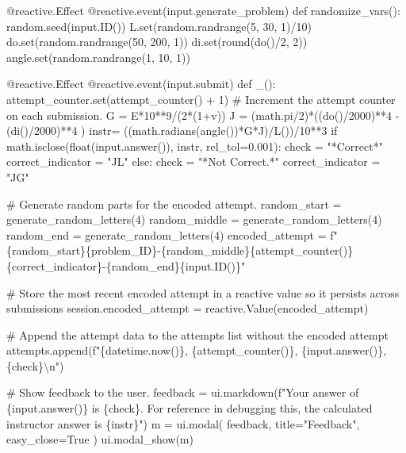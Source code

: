 \documentclass[
  letterpaper,
  DIV=11,
  numbers=noendperiod]{scrreprt}
\newenvironment{Shaded}{\begin{snugshade}}{\end{snugshade}}
\newcommand{\NormalTok}[1]{\textcolor[rgb]{0.00,0.23,0.31}{#1}}
\begin{document}
\begin{Shaded}
\begin{Highlighting}[]
\NormalTok{    @reactive.Effect}
\NormalTok{    @reactive.event(input.generate\_problem)}
\NormalTok{    def randomize\_vars():}
\NormalTok{        random.seed(input.ID())}
\NormalTok{        L.set(random.randrange(5, 30, 1)/10)}
\NormalTok{        do.set(random.randrange(50, 200, 1))}
\NormalTok{        di.set(round(do()/2, 2))}
\NormalTok{        angle.set(random.randrange(1, 10, 1))}
        
\NormalTok{    @reactive.Effect}
\NormalTok{    @reactive.event(input.submit)}
\NormalTok{    def \_():}
\NormalTok{        attempt\_counter.set(attempt\_counter() + 1)  \# Increment the attempt counter on each submission.}
\NormalTok{        G = E*10**9/(2*(1+v))}
\NormalTok{        J = (math.pi/2)*((do()/2000)**4 {-}(di()/2000)**4 )}
\NormalTok{        instr= ((math.radians(angle())*G*J)/L())/10**3}
\NormalTok{        if math.isclose(float(input.answer()), instr, rel\_tol=0.001):}
\NormalTok{            check = "*Correct*"}
\NormalTok{            correct\_indicator = "JL"}
\NormalTok{        else:}
\NormalTok{            check = "*Not Correct.*"}
\NormalTok{            correct\_indicator = "JG"}

\NormalTok{        \# Generate random parts for the encoded attempt.}
\NormalTok{        random\_start = generate\_random\_letters(4)}
\NormalTok{        random\_middle = generate\_random\_letters(4)}
\NormalTok{        random\_end = generate\_random\_letters(4)}
\NormalTok{        encoded\_attempt = f"\{random\_start\}\{problem\_ID\}{-}\{random\_middle\}\{attempt\_counter()\}\{correct\_indicator\}{-}\{random\_end\}\{input.ID()\}"}

\NormalTok{        \# Store the most recent encoded attempt in a reactive value so it persists across submissions}
\NormalTok{        session.encoded\_attempt = reactive.Value(encoded\_attempt)}

\NormalTok{        \# Append the attempt data to the attempts list without the encoded attempt}
\NormalTok{        attempts.append(f"\{datetime.now()\}, \{attempt\_counter()\}, \{input.answer()\}, \{check\}\textbackslash{}n")}

\NormalTok{        \# Show feedback to the user.}
\NormalTok{        feedback = ui.markdown(f"Your answer of \{input.answer()\} is \{check\}. For reference in debugging this, the calculated instructor answer is \{instr\}")}
\NormalTok{        m = ui.modal(}
\NormalTok{            feedback,}
\NormalTok{            title="Feedback",}
\NormalTok{            easy\_close=True}
\NormalTok{        )}
\NormalTok{        ui.modal\_show(m)}


\end{Highlighting}
\end{Shaded}
\end{document}
